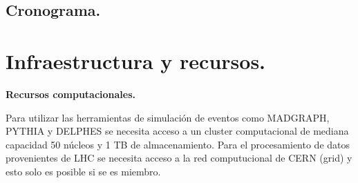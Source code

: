 \subsection{Cronograma.}

\begin{table}[h]
	\centering
\end{table}

\newpage

\section{Infraestructura y recursos.}

\textbf{Recursos computacionales.}

Para utilizar las herramientas de simulación de eventos como MADGRAPH, PYTHIA y DELPHES se necesita acceso a un cluster computacional de mediana capacidad	 50 núcleos y 1 TB de almacenamiento. Para el procesamiento de datos provenientes de LHC se necesita acceso a la red computucional de CERN (grid) y esto solo es posible si se es miembro.

